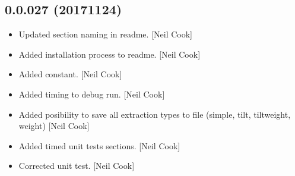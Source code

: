 \documentclass[a4paper,10pt,english]{report}
\begin{document}
\subsection{0.0.027 (2017\sphinxhyphen{}11\sphinxhyphen{}24)}
\label{\detokenize{misc/changelog:id543}}\begin{itemize}
\item {} 
Updated section naming in readme. {[}Neil Cook{]}

\item {} 
Added installation process to readme. {[}Neil Cook{]}

\item {} 
Added  constant. {[}Neil Cook{]}

\item {} 
Added timing to debug run. {[}Neil Cook{]}

\item {} 
Added posibility to save all extraction types to file (simple, tilt,
tiltweight, weight) {[}Neil Cook{]}

\item {} 
Added timed unit tests sections. {[}Neil Cook{]}

\item {} 
Corrected unit test. {[}Neil Cook{]}

\end{itemize}
\end{document}
